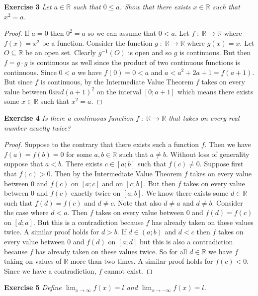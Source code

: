 \documentclass{article}
\begin{document}
\begin{flushleft}
\textbf{Exercise 3}
\textsl{Let $a \in \mathbb{R}$ such that $0 \leq a$. Show that there exists $x \in \mathbb{R}$ such that $x^2=a$.}
\begin{proof}
If $a=0$ then $0^2=a$ so we can assume that $0 < a$. Let $f \; : \; \mathbb{R} \rightarrow \mathbb{R}$ where $f(x)=x^2$ be a function. Consider the function $g \; : \; \mathbb{R} \rightarrow \mathbb{R}$ where $g(x)=x$. Let $O \subseteq \mathbb{R}$ be an open set. Clearly $g^{-1}(O)$ is open and so $g$ is continuous. But then $f=g \cdot g$ is continuous as well since the product of two continuous functions is continuous. Since $0<a$ we have $f(0)=0<a$ and $a<a^2+2a+1=f(a+1)$. But since $f$ is continuous, by the Intermediate Value Theorem $f$ takes on every value between $0 and (a+1)^2$ on the interval $[0;a+1]$ which means there exists some $x \in \mathbb{R}$ such that $x^2=a$.
\end{proof}

\textbf{Exercise 4}
\textsl{Is there a continuous function $f \; : \; \mathbb{R} \rightarrow \mathbb{R}$ that takes on every real number exactly twice?}
\begin{proof}
Suppose to the contrary that there exists such a function $f$. Then we have $f(a)=f(b)=0$ for some $a,b \in \mathbb{R}$ such that $a \neq b$. Without loss of generality suppose that $a<b$. There exists $c \in [a;b]$ such that $f(c) \neq 0$. Suppose first that $f(c)>0$. Then by the Intermediate Value Theorem $f$ takes on every value between $0$ and $f(c)$ on $[a;c]$ and on $[c;b]$. But then $f$ takes on every value between $0$ and $f(c)$ exactly twice on $[a;b]$. We know there exists some $d \in \mathbb{R}$ such that $f(d)=f(c)$ and $d \neq c$. Note that also $d \neq a$ and $d \neq b$. Consider the case where $d<a$. Then $f$ takes on every value between $0$ and $f(d)=f(c)$ on $[d;a]$. But this is a contradiction because $f$ has already taken on these values twice. A similar proof holds for $d>b$. If $d \in (a;b)$ and $d<c$ then $f$ takes on every value between $0$ and $f(d)$ on $[a;d]$ but this is also a contradiction because $f$ has already taken on these values twice. So for all $d \in \mathbb{R}$ we have $f$ taking on values of $\mathbb{R}$ more than two times. A similar proof holds for $f(c)<0$. Since we have a contradiction, $f$ cannot exist.
\end{proof}

\textbf{Exercise 5}
\textsl{Define $\lim_{x \rightarrow \infty} f(x) = l$ and $\lim_{x \rightarrow -\infty} f(x) = l$.}\newline


\end{flushleft}
\end{document}
